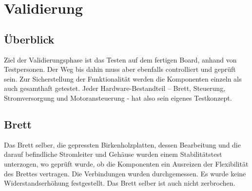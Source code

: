 \chapter{Validierung} \label{Validierung}


\section{Überblick} \label{ValidUeberblick}
Ziel der Validierungsphase ist das Testen auf dem fertigen Board, anhand von Testpersonen. Der Weg bis dahin muss aber ebenfalls controlliert und geprüft sein. Zur Sicherstellung der Funktionalität werden die Komponenten einzeln als auch gesamthaft getestet. 
Jeder Hardware-Bestandteil – Brett, Steuerung, Stromversorgung und Motoransteuerung - hat also sein eigenes Testkonzept.

\section{Brett} \label{ValidBrett}
Das Brett selber, die gepressten Birkenholzplatten, dessen Bearbeitung und die darauf befindliche Stromleiter und Gehäuse wurden einem Stabilitätstest unterzogen, wo geprüft wurde, ob die Komponenten ein Ausreizen der Flexibilität des Brettes vertragen. Die Verbindungen wurden durchgemessen. Es wurde keine Widerstandserhöhung festgestellt. Das Brett selber ist auch nicht zerbrochen.

